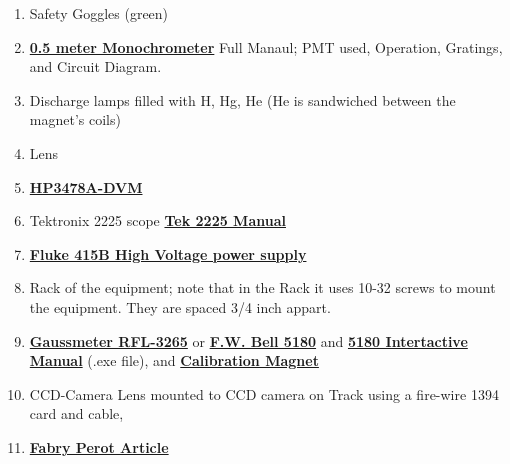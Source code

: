 \documentclass{../lab}
\begin{document}
\begin{enumerate}
    \item Safety Goggles (green)

    \item \href{http://physics111.lib.berkeley.edu/Physics111/Reprints/ATM/ARC\%20Model\%20AM505\%20scanning\%20monochromator.pdf}{\textbf{0.5 meter Monochrometer}} Full Manaul; PMT used, Operation, Gratings, and Circuit Diagram.

    \item Discharge lamps filled with H, Hg, He (He is sandwiched between the magnet's coils)

    \item Lens

    \item \href{http://physics111.lib.berkeley.edu/Physics111/Equipment\_Manuals/Hewlett\%20Packard/hp3478a\%20multimeter.pdf}{\textbf{HP3478A-DVM}}

    \item Tektronix 2225 scope \href{http://physics111.lib.berkeley.edu/Physics111/Equipment\_Manuals/Tektronix/OCR\%202225\%20Tektronix\%20\%20Oscilloscope\%20operating\%20manual.pdf}{\textbf{Tek 2225 Manual}}

    \item \href{http://physics111.lib.berkeley.edu/Physics111/Equipment\_Manuals/Fluke/GMA\%20OCR\%20Fluke\%20415B\%20power\%20supply.pdf}{\textbf{Fluke 415B High Voltage power supply}}

    \item Rack of the equipment; note that in the Rack it uses 10-32 screws to mount the equipment. They are spaced 3/4 inch appart.

    \item \href{http://physics111.lib.berkeley.edu/Physics111/Reprints/ATM/RFL\%203265\%20Gaussmeter.pdf}{\textbf{Gaussmeter RFL-3265}} or \href{http://physics111.lib.berkeley.edu/Physics111/Reprints/ATM/Gaussmeter5180.pdf}{\textbf{F.W. Bell 5180}} and \href{http://physics111.lib.berkeley.edu/Physics111/Reprints/ATM/5180Manual.exe}{\textbf{5180 Intertactive Manual}} (.exe file), and \href{http://physics111.lib.berkeley.edu/Physics111/Reprints/ATM/Cal\_mag\_Guass\_Meter\_sm.jpg}{\textbf{Calibration Magnet}}

    \item CCD-Camera Lens mounted to CCD camera on Track using a fire-wire 1394 card and cable,

    \item \href{http://physics111.lib.berkeley.edu/Physics111/Reprints/ATM/OCR\%20Burleigh\%20tech\%20memo\%20fabry\%20perots.pdf}{\textbf{Fabry Perot Article}}


\end{enumerate}
\end{document}
